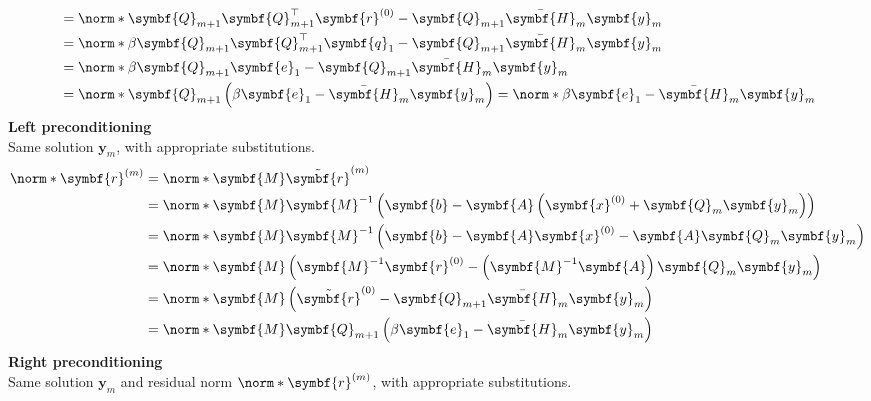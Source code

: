 \documentclass{article}
\begin{document}
\begin{multicols}{2}
\begin{align*}
                                             & = \norm*{\symbf{Q}_{m+1} \symbf{Q}_{m+1}^\top \symbf{r}^{\left( 0 \right)} - \symbf{Q}_{m+1} \bar{\symbf{H}}_m \symbf{y}_m}                            \\
                                             & = \norm*{\beta \symbf{Q}_{m+1} \symbf{Q}_{m+1}^\top \symbf{q}_1 - \symbf{Q}_{m+1} \bar{\symbf{H}}_m \symbf{y}_m}                                       \\
                                             & = \norm*{\beta \symbf{Q}_{m+1} \symbf{e}_1 - \symbf{Q}_{m+1} \bar{\symbf{H}}_m \symbf{y}_m}                                                            \\
                                             & = \norm*{\symbf{Q}_{m+1} \left( \beta \symbf{e}_1 - \bar{\symbf{H}}_m \symbf{y}_m \right)} = \norm*{\beta \symbf{e}_1 - \bar{\symbf{H}}_m \symbf{y}_m}
    \end{align*}
    \textbf{Left preconditioning} \\
    Same solution \(\symbf{y}_m\), with appropriate substitutions.
    \begin{align*}
        \norm*{\symbf{r}^{\left( m \right)}} & = \norm*{\symbf{M} \tilde{\symbf{r}}^{\left( m \right)}}                                                                                                     \\
                                             & = \norm*{\symbf{M} \symbf{M}^{-1} \left( \symbf{b} - \symbf{A} \left( \symbf{x}^{\left( 0 \right)} + \symbf{Q}_m \symbf{y}_m \right) \right)}                \\
                                             & = \norm*{\symbf{M} \symbf{M}^{-1} \left( \symbf{b} - \symbf{A} \symbf{x}^{\left( 0 \right)} - \symbf{A} \symbf{Q}_m \symbf{y}_m \right)}                     \\
                                             & = \norm*{\symbf{M} \left( \symbf{M}^{-1} \symbf{r}^{\left( 0 \right)} - \left( \symbf{M}^{-1} \symbf{A} \right) \symbf{Q}_m \symbf{y}_m \right)}             \\
                                             & = \norm*{\symbf{M} \left( \tilde{\symbf{r}}^{\left( 0 \right)} - \symbf{Q}_{m+1} \bar{\symbf{H}}_m \symbf{y}_m \right)}                                      \\
                                             & = \norm*{\symbf{M} \symbf{Q}_{m+1} \left( \beta \symbf{e}_1 - \bar{\symbf{H}}_m \symbf{y}_m \right)}
    \end{align*}
    \textbf{Right preconditioning} \\
    Same solution \(\symbf{y}_m\) and residual norm \(\norm*{\symbf{r}^{\left( m \right)}}\), with appropriate
    substitutions.
\end{multicols}
\end{document}
